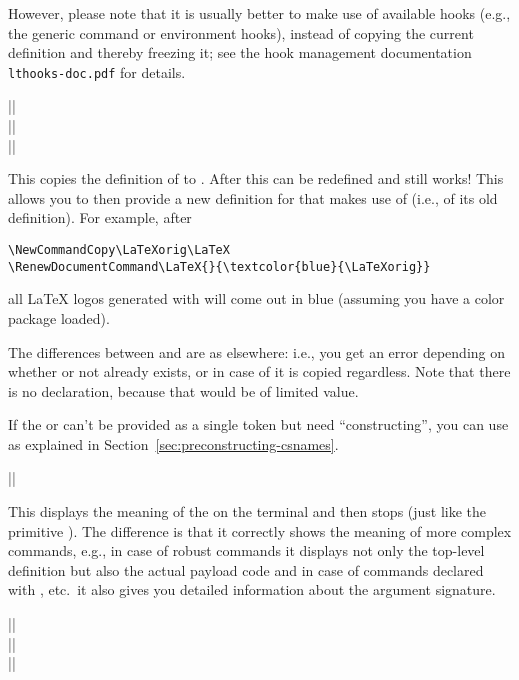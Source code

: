 \documentclass{ltxguide}
\begin{document}
However, please note that it is usually better to make use of
available hooks (e.g., the generic command or environment hooks),
instead of copying the current definition and thereby freezing it; see
the hook management documentation \texttt{lthooks-doc.pdf} for
details.

\begin{decl}
  |\NewCommandCopy|         \\
  |\RenewCommandCopy|       \\
  |\DeclareCommandCopy|    
\end{decl}

This copies the definition of  to . After
this  can be redefined and 
still works! This allows you to then provide a new definition for
 that makes use of  (i.e., of its old
definition). For example, after
\begin{verbatim}
\NewCommandCopy\LaTeXorig\LaTeX
\RenewDocumentCommand\LaTeX{}{\textcolor{blue}{\LaTeXorig}}
\end{verbatim}
all \LaTeX{} logos generated with  will come out in blue
(assuming you have a color package loaded).

The differences between  and  are as
elsewhere: i.e., you get an error depending on whether or not
 already exists, or in case of  it is copied
regardless. Note that there is no  declaration, because
that would be of limited value.


If the  or  can't be provided as a single
token but need \enquote{constructing}, you can use 
as explained in
Section~\ref{sec:preconstructing-csnames}.

\begin{decl}
  |\ShowCommand|       
\end{decl}

This displays the meaning of the  on the terminal and then
stops (just like the primitive ). The difference is that it
correctly shows the meaning of more complex commands, e.g., in case of
robust commands it displays not only the top-level definition but
also the actual payload code and in case of commands declared with
, etc.\ it also gives you detailed information
about the argument signature.

\begin{decl}
  |\NewEnvironmentCopy|         \\
  |\RenewEnvironmentCopy|       \\
  |\DeclareEnvironmentCopy|    
\end{decl}
\end{document}
